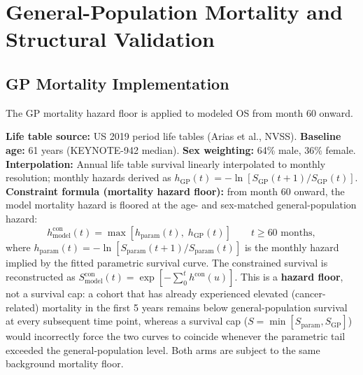 \documentclass[11pt,a4paper]{article}
\begin{document}
\section{General-Population Mortality and Structural Validation}

\subsection{GP Mortality Implementation}
\label{sec:gp_impl}
The GP mortality hazard floor is applied to modeled OS from month 60 onward.

\textbf{Life table source:} US 2019 period life tables (Arias et al., NVSS).
\textbf{Baseline age:} 61 years (KEYNOTE-942 median). \textbf{Sex weighting:} 64\% male, 36\% female.
\textbf{Interpolation:} Annual life table survival linearly interpolated to monthly resolution; monthly hazards derived as $h_{\text{GP}}(t) = -\ln[S_{\text{GP}}(t{+}1)/S_{\text{GP}}(t)]$.
\textbf{Constraint formula (mortality hazard floor):} from month 60 onward, the model mortality hazard is floored at the age- and sex-matched general-population hazard:
\begin{equation}
    h_{\text{model}}^{\text{con}}(t) = \max\left[h_{\text{param}}(t),\; h_{\text{GP}}(t)\right] \qquad t \geq 60 \text{ months},
\end{equation}
where $h_{\text{param}}(t) = -\ln[S_{\text{param}}(t{+}1)/S_{\text{param}}(t)]$ is the monthly hazard implied by the fitted parametric survival curve. The constrained survival is reconstructed as $S_{\text{model}}^{\text{con}}(t) = \exp[-\sum_{0}^{t} h^{\text{con}}(u)]$. This is a \textbf{hazard floor}, not a survival cap: a cohort that has already experienced elevated (cancer-related) mortality in the first 5 years remains below general-population survival at every subsequent time point, whereas a survival cap ($S = \min[S_{\text{param}}, S_{\text{GP}}]$) would incorrectly force the two curves to coincide whenever the parametric tail exceeded the general-population level. Both arms are subject to the same background mortality floor.
\end{document}
